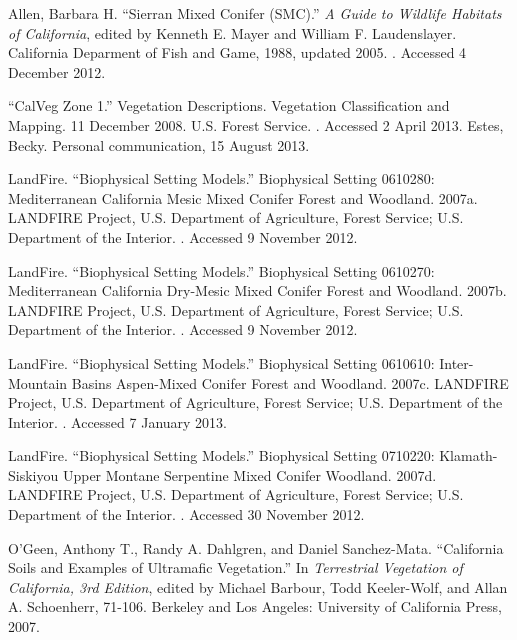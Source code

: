 \begin{hangparas}{.25in}{1} 
Allen, Barbara H. ``Sierran Mixed Conifer (SMC).'' \emph{A Guide to Wildlife Habitats of California}, edited by Kenneth E. Mayer and William F. Laudenslayer. California Deparment of Fish and Game, 1988, updated 2005. . Accessed 4 December 2012.

``CalVeg Zone 1.'' Vegetation Descriptions. Vegetation Classification and Mapping.  11 December 2008. U.S. Forest Service. . Accessed 2 April 2013.
Estes, Becky. Personal communication, 15 August 2013.

LandFire. ``Biophysical Setting Models.'' Biophysical Setting 0610280: Mediterranean California Mesic Mixed Conifer Forest and Woodland. 2007a. LANDFIRE Project, U.S. Department of Agriculture, Forest Service; U.S. Department of the Interior. . Accessed 9 November 2012.

LandFire. ``Biophysical Setting Models.'' Biophysical Setting 0610270: Mediterranean California Dry-Mesic Mixed Conifer Forest and Woodland. 2007b. LANDFIRE Project, U.S. Department of Agriculture, Forest Service; U.S. Department of the Interior. . Accessed 9 November 2012.

LandFire. ``Biophysical Setting Models.'' Biophysical Setting 0610610: Inter-Mountain Basins Aspen-Mixed Conifer Forest and Woodland. 2007c. LANDFIRE Project, U.S. Department of Agriculture, Forest Service; U.S. Department of the Interior. . Accessed 7 January 2013.

LandFire. ``Biophysical Setting Models.'' Biophysical Setting 0710220: Klamath-Siskiyou Upper Montane Serpentine Mixed Conifer Woodland. 2007d. LANDFIRE Project, U.S. Department of Agriculture, Forest Service; U.S. Department of the Interior. . Accessed 30 November 2012.

O'Geen, Anthony T., Randy A. Dahlgren, and Daniel Sanchez-Mata. ``California Soils and Examples of Ultramafic Vegetation.'' In \emph{Terrestrial Vegetation of California, 3rd Edition}, edited by Michael Barbour, Todd Keeler-Wolf, and Allan A. Schoenherr, 71-106. Berkeley and Los Angeles: University of California Press, 2007. 


\end{hangparas}
